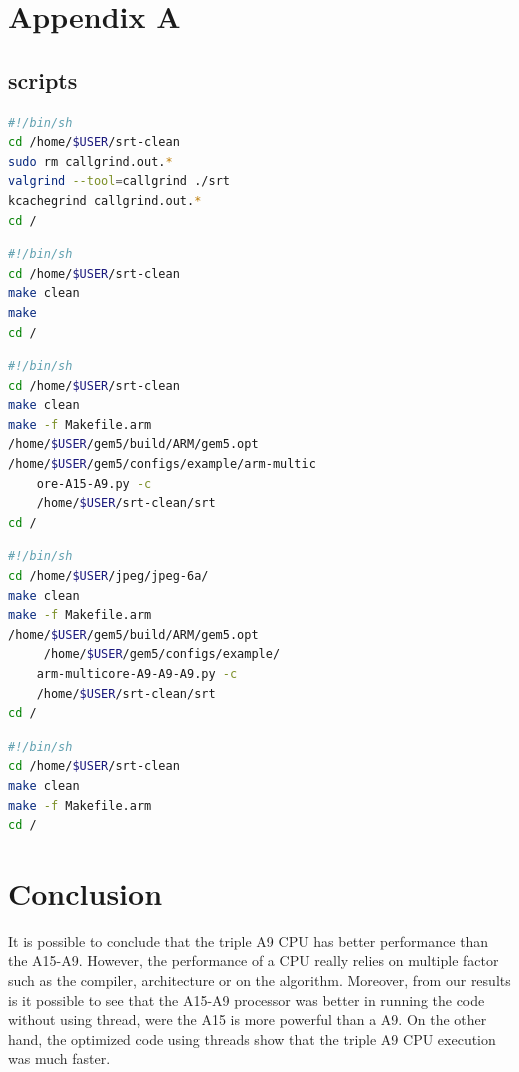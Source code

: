\documentclass[journal]{IEEEtran}
\begin{document}
\section{Appendix A}
\subsection{scripts}
\begin{lstlisting}[language=bash,caption={bash}]
#!/bin/sh
cd /home/$USER/srt-clean
sudo rm callgrind.out.*
valgrind --tool=callgrind ./srt
kcachegrind callgrind.out.*
cd /
\end{lstlisting}

\begin{lstlisting}[language=bash,caption={bash}]
#!/bin/sh
cd /home/$USER/srt-clean
make clean
make
cd /
\end{lstlisting}

\begin{lstlisting}[language=bash,caption={bash}]
#!/bin/sh
cd /home/$USER/srt-clean
make clean
make -f Makefile.arm
/home/$USER/gem5/build/ARM/gem5.opt
/home/$USER/gem5/configs/example/arm-multic
	ore-A15-A9.py -c
	/home/$USER/srt-clean/srt
cd /
\end{lstlisting}

\begin{lstlisting}[language=bash,caption={bash}]
#!/bin/sh
cd /home/$USER/jpeg/jpeg-6a/
make clean
make -f Makefile.arm
/home/$USER/gem5/build/ARM/gem5.opt
	 /home/$USER/gem5/configs/example/
	arm-multicore-A9-A9-A9.py -c 
	/home/$USER/srt-clean/srt
cd /
\end{lstlisting}


\begin{lstlisting}[language=bash,caption={bash}]
#!/bin/sh
cd /home/$USER/srt-clean
make clean
make -f Makefile.arm
cd /
\end{lstlisting}



\section{Conclusion}
It is possible to conclude that the triple A9 CPU has better performance than the A15-A9. However, the performance of a CPU really relies on multiple factor such as the compiler, architecture or on the algorithm. Moreover, from our results is it possible to see that the A15-A9 processor was better in running the code without using thread, were the A15 is more powerful than a A9. On the other hand, the optimized code using threads show that the triple A9 CPU execution was much faster.
\end{document}
